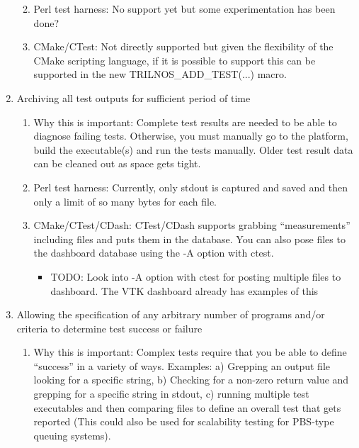\documentclass[pdf,ps2pdf,11pt]{SANDreport}
\begin{document}
\begin{enumerate}
\begin{enumerate}
  {}\item Perl test harness: No support yet but some experimentation
  has been done?

  {}\item CMake/CTest: Not directly supported but given the
  flexibility of the CMake scripting language, if it is possible to
  support this can be supported in the new TRILNOS\_ADD\_TEST(...) 
  macro.

  \end{enumerate}

{}\item Archiving all test outputs for sufficient period of time

  \begin{enumerate}

  {}\item Why this is important: Complete test results are needed to
  be able to diagnose failing tests.  Otherwise, you must manually
  go to the platform, build the executable(s) and run the tests
  manually.  Older test result data can be cleaned out as space gets
  tight.

  {}\item Perl test harness: Currently, only stdout is captured and
  saved and then only a limit of so many bytes for each file.

  {}\item CMake/CTest/CDash: CTest/CDash supports grabbing
  ``measurements'' including files and puts them in the database.  You
  can also pose files to the dashboard database using the -A option
  with ctest.

    \begin{itemize}

    {}\item TODO: Look into -A option with ctest for posting multiple
    files to dashboard.  The VTK dashboard already has examples of
    this

    \end{itemize}

  \end{enumerate}

{}\item Allowing the specification of any arbitrary number of
programs and/or criteria to determine test success or failure

  \begin{enumerate}

  {}\item Why this is important: Complex tests require that you be
  able to define ``success'' in a variety of ways.  Examples: a)
  Grepping an output file looking for a specific string, b) Checking
  for a non-zero return value and grepping for a specific string in
  stdout, c) running multiple test executables and then comparing
  files to define an overall test that gets reported (This could also
  be used for scalability testing for PBS-type queuing systems).


\end{enumerate}
\end{enumerate}
\end{document}

